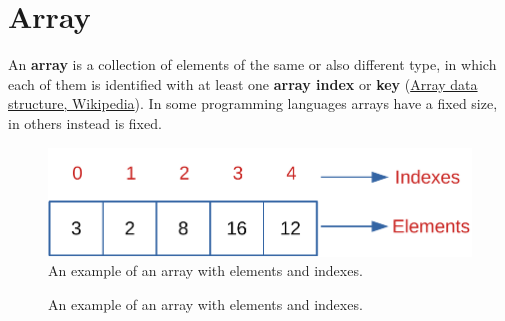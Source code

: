 \section{Array}
An \textbf{array} is a collection of elements of the same or also different type, in which each of them is identified with at least one \textbf{array index} or \textbf{key} \cite{wikiarray} (\href{https://en.wikipedia.org/wiki/Array_data_structure}{Array data structure, Wikipedia}). In some programming languages arrays have a fixed size, in others instead is fixed.
\begin{figure}[H]
	\begin{center}
		\includegraphics[scale=0.6]{chapters/datastructures/images/array_1.pdf}
		\caption[An example of an array with elements and indexes.]{An example of an array with elements and indexes.}
		\label{array_1}
	\end{center}
\end{figure}

\begin{figure}[H]
\centering
{}
\caption[An example of an array with elements and indexes.]{An example of an array with elements and indexes.}
\label{array_1}
\end{figure}

